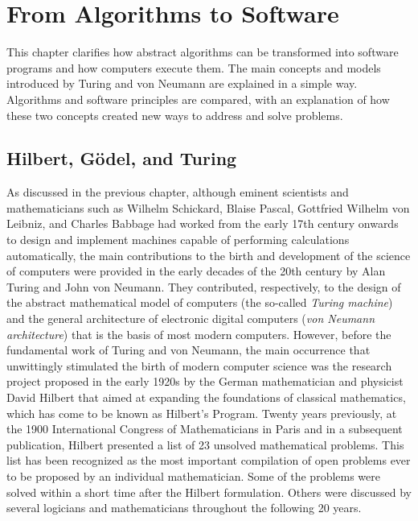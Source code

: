 




%

\setcounter{chapter}{1}



\chapter{\label{chap:2}From Algorithms to Software}

This chapter clarifies how abstract algorithms can be transformed into software programs and how computers execute them. The main concepts and models introduced by Turing and von Neumann are explained in a simple way. Algorithms and software principles are compared, with an explanation of how these two concepts created new ways to address and solve problems.


\section{\label{sec:2.1}Hilbert, G\"{o}del, and Turing}
As discussed in the previous chapter, although eminent scientists and
mathematicians such as Wilhelm Schickard, Blaise Pascal, Gottfried
Wilhelm von \hbox{Leibniz,} and Charles Babbage had worked from the early 17th century onwards to design and implement machines capable of performing calculations automatically, the main contributions to the birth and development of the science of computers were provided in the early decades of the 20th century by Alan Turing and John von \hbox{Neumann.} They contributed, respectively, to the design of the abstract mathematical model of computers (the so-called \textit{Turing machine}) and the general architecture of electronic digital computers (\textit{von Neumann architecture}) that is the basis of most modern computers. However, before the fundamental work of Turing and von \hbox{Neumann,} the main occurrence that unwittingly stimulated the birth of \hbox{modern} computer science was the research project proposed in the early 1920s by the German mathematician and physicist David Hilbert that aimed at expanding the foundations of classical mathematics, which has come to be known as Hilbert's Program. Twenty years previously, at the 1900 International Congress of \hbox{Mathematicians} in Paris and in a subsequent publication, Hilbert presented a list of 23 unsolved mathematical problems. This list has been recognized as the most important compilation of open problems ever to be proposed by an individual mathematician. Some of the problems were\vadjust{\vspace*{12pt}\pagebreak} solved within a short time after the Hilbert formulation. Others were discussed by several logicians and mathematicians throughout the following 20 years.

